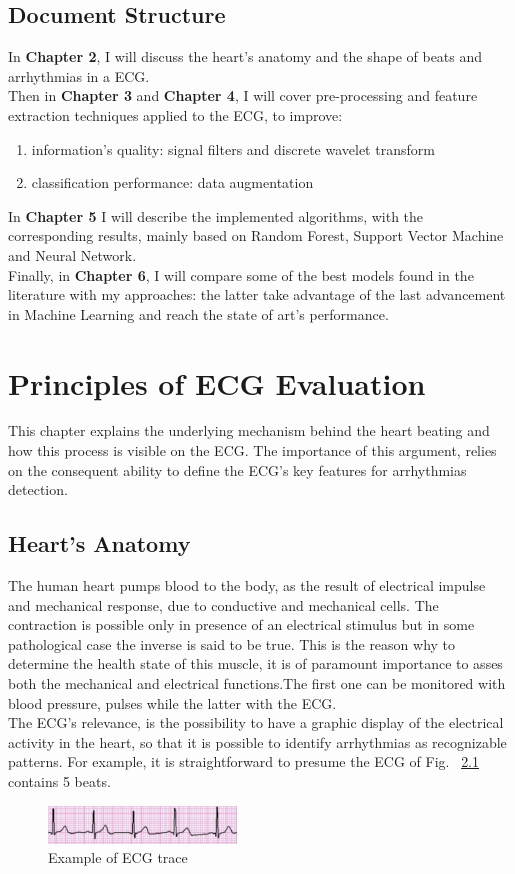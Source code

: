\documentclass[LaM,binding=0.6cm]{sapthesis}
\begin{document}
\section{Document Structure}
In \textbf{Chapter 2}, I will discuss the heart's anatomy and the shape of beats and arrhythmias in a ECG.\\Then in \textbf{Chapter 3} and \textbf{Chapter 4}, I will cover pre-processing and feature extraction techniques applied to the ECG, to improve:
\begin{enumerate}
\item information's quality: signal filters and discrete wavelet transform
\item classification performance: data augmentation 
\end{enumerate}
In \textbf{Chapter 5} I will describe the implemented algorithms, with the corresponding results, mainly based on Random Forest, Support Vector Machine and Neural Network.\\Finally, in \textbf{Chapter 6}, I will compare some of the best models found in the literature with my approaches: the latter take advantage of the last advancement in Machine Learning and reach the state of art's performance.


\chapter{Principles of ECG Evaluation}
This chapter explains the underlying mechanism behind the heart beating and how this process is visible on the ECG. The importance of this argument, relies on the consequent ability to define the ECG's key features for arrhythmias detection.

\section{Heart's Anatomy }

The human heart pumps blood to the body, as the result of electrical impulse and mechanical response, due to conductive and mechanical cells. The contraction is possible only in presence of an electrical stimulus but in some pathological case the inverse is said to be true. This is the reason why to determine the health state of this muscle, it is of paramount importance to asses both the mechanical and electrical functions.The first one can be monitored with blood pressure, pulses while the latter with the ECG.\\The ECG's relevance, is the possibility to have a graphic display of the electrical activity in the heart, so that it is possible to identify arrhythmias as recognizable patterns. For example, it is straightforward to presume the ECG of Fig. ~\ref{fig:ecgex} contains 5 beats.
\begin{figure}[H]
	\includegraphics[width=50mm,scale=0.7]{ecgtrace}
	\caption{Example of ECG trace}
	\label{fig:ecgex}
\end{figure}
\end{document}
